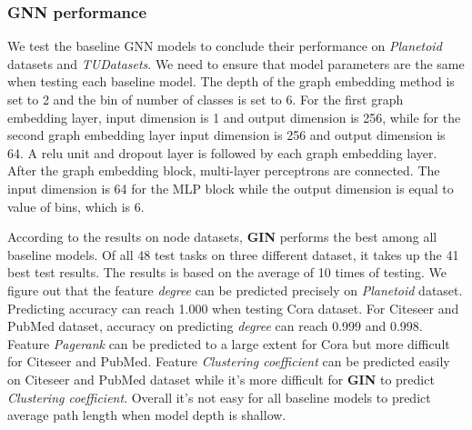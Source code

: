 \documentclass[sigconf]{acmart}
\begin{document}
\subsubsection{GNN  performance}
We test the baseline GNN models to conclude their performance on \textit{Planetoid} datasets and \textit{TUDatasets}.
We need to ensure that model parameters are the same when testing each baseline model. 
The depth of the graph embedding method is set to 2 and the bin of number of classes is set to 6. For the first graph embedding layer,
input dimension is 1 and output dimension is 256, while for the second graph embedding layer input dimension is 256 and output dimension is 64.
A relu unit and dropout layer is followed by each graph embedding layer. After the graph embedding block, multi-layer perceptrons are connected.
The input dimension is 64 for the MLP block while the output dimension is equal to value of bins, which is 6.  

According to the results on node datasets,
\textbf{GIN} performs the best among all baseline models. Of all 48 test tasks on three different dataset,
it takes up the 41 best test results. The results is based on the average of 10 times of testing.
We figure out that the feature \textit{degree} can be predicted precisely on \textit{Planetoid} dataset.
Predicting accuracy can reach 1.000 when testing {\sc Cora} dataset. For {\sc Citeseer} and {\sc PubMed} dataset,
accuracy on predicting \textit{degree} can reach 0.999 and 0.998. Feature \textit{Pagerank} can be predicted to a large extent for 
{\sc Cora} but more difficult for {\sc Citeseer} and {\sc PubMed}. Feature \textit{Clustering coefficient} can be predicted easily on
{\sc Citeseer} and {\sc PubMed} dataset while it's more difficult for \textbf{GIN} to predict \textit{Clustering coefficient}.
Overall it's not easy for all baseline models to predict average path length when model depth is shallow.
\end{document}
